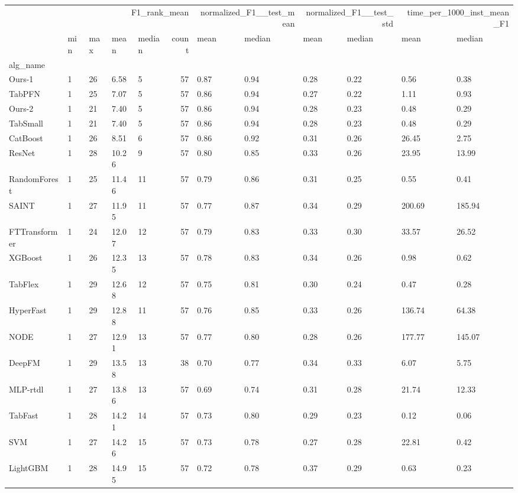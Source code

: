 \begin{tabular}{lllllrllllll}
\toprule
 & \multicolumn{5}{r}{F1_rank_mean} & \multicolumn{2}{r}{normalized_F1__test_mean} & \multicolumn{2}{r}{normalized_F1__test_std} & \multicolumn{2}{r}{time_per_1000_inst_mean_F1} \\
 & min & max & mean & median & count & mean & median & mean & median & mean & median \\
alg_name &  &  &  &  &  &  &  &  &  &  &  \\
\midrule
Ours-1 & 1 & 26 & 6.58 & 5 & 57 & 0.87 & 0.94 & 0.28 & 0.22 & 0.56 & 0.38 \\
TabPFN & 1 & 25 & 7.07 & 5 & 57 & 0.86 & 0.94 & 0.27 & 0.22 & 1.11 & 0.93 \\
Ours-2 & 1 & 21 & 7.40 & 5 & 57 & 0.86 & 0.94 & 0.28 & 0.23 & 0.48 & 0.29 \\
TabSmall & 1 & 21 & 7.40 & 5 & 57 & 0.86 & 0.94 & 0.28 & 0.23 & 0.48 & 0.29 \\
CatBoost & 1 & 26 & 8.51 & 6 & 57 & 0.86 & 0.92 & 0.31 & 0.26 & 26.45 & 2.75 \\
ResNet & 1 & 28 & 10.26 & 9 & 57 & 0.80 & 0.85 & 0.33 & 0.26 & 23.95 & 13.99 \\
RandomForest & 1 & 25 & 11.46 & 11 & 57 & 0.79 & 0.86 & 0.31 & 0.25 & 0.55 & 0.41 \\
SAINT & 1 & 27 & 11.95 & 11 & 57 & 0.77 & 0.87 & 0.34 & 0.29 & 200.69 & 185.94 \\
FTTransformer & 1 & 24 & 12.07 & 12 & 57 & 0.79 & 0.83 & 0.33 & 0.30 & 33.57 & 26.52 \\
XGBoost & 1 & 26 & 12.35 & 13 & 57 & 0.78 & 0.83 & 0.34 & 0.26 & 0.98 & 0.62 \\
TabFlex & 1 & 29 & 12.68 & 12 & 57 & 0.75 & 0.81 & 0.30 & 0.24 & 0.47 & 0.28 \\
HyperFast & 1 & 29 & 12.88 & 11 & 57 & 0.76 & 0.85 & 0.33 & 0.26 & 136.74 & 64.38 \\
NODE & 1 & 27 & 12.91 & 13 & 57 & 0.77 & 0.80 & 0.28 & 0.26 & 177.77 & 145.07 \\
DeepFM & 1 & 29 & 13.58 & 13 & 38 & 0.70 & 0.77 & 0.34 & 0.33 & 6.07 & 5.75 \\
MLP-rtdl & 1 & 27 & 13.86 & 13 & 57 & 0.69 & 0.74 & 0.31 & 0.28 & 21.74 & 12.33 \\
TabFast & 1 & 28 & 14.21 & 14 & 57 & 0.73 & 0.80 & 0.29 & 0.23 & 0.12 & 0.06 \\
SVM & 1 & 27 & 14.26 & 15 & 57 & 0.73 & 0.78 & 0.27 & 0.28 & 22.81 & 0.42 \\
LightGBM & 1 & 28 & 14.95 & 15 & 57 & 0.72 & 0.78 & 0.37 & 0.29 & 0.63 & 0.23 \\

\end{tabular}
